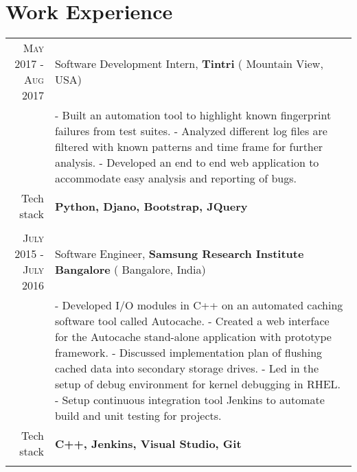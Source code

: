 \section {Work Experience}
\renewcommand{\arraystretch}{0.95}%
\begin{tabular}{r|p{14cm}}
\textsc{May 2017 - Aug 2017} & Software Development Intern, \textbf{Tintri} ( Mountain View, USA)\\
& \small{
- Built an automation tool to highlight known fingerprint failures from test suites. \newline
- Analyzed different log files are filtered with known patterns and time frame for further analysis.\newline
- Developed an end to end web application to accommodate easy analysis and reporting of bugs.} \\
\small{Tech stack} &\footnotesize{\textbf{Python, Djano, Bootstrap, JQuery}} \\
\multicolumn{2}{c}{} \\

\textsc{July 2015 - July 2016} & Software Engineer, \textbf{Samsung Research Institute Bangalore} ( Bangalore, India) \\
& \small{
- Developed I/O modules in C++ on an automated caching software tool called Autocache.\newline
- Created a web interface for the Autocache stand-alone application with prototype framework.\newline
- Discussed implementation plan of flushing cached data into secondary storage drives.\newline
- Led in the setup of debug environment for kernel debugging in RHEL. \newline
- Setup continuous integration tool Jenkins to automate build and unit testing for projects.}\\
\small{Tech stack} &\footnotesize{\textbf{C++, Jenkins, Visual Studio, Git}} \\
\multicolumn{2}{c}{} \\




\end{tabular}
